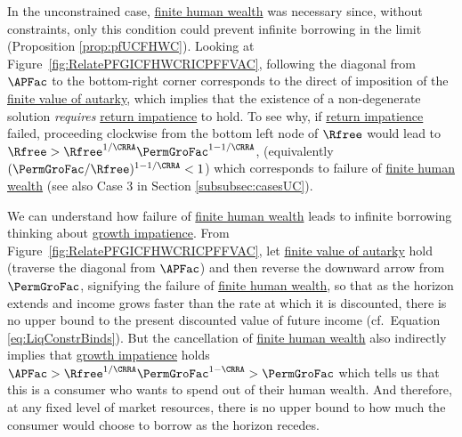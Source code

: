 \documentclass[\econtexRoot/BufferStockTheory]{subfiles}
\begin{document}
In the unconstrained case, \hyperlink{FHWC}{finite human wealth} was necessary since, without constraints, only  this condition could prevent infinite borrowing in the limit (Proposition \ref{prop:pfUCFHWC}).
Looking at Figure~\ref{fig:RelatePFGICFHWCRICPFFVAC}, following the diagonal from $\APFac$ to the bottom-right corner corresponds to the direct of imposition of the \hyperlink{PFFVAC}{finite value of autarky}, which implies that the existence of a non-degenerate solution \textit{requires} \hyperlink{RIC}{return impatience} to hold.
To see why, if \hyperlink{RIC}{return impatience} failed, proceeding clockwise from the bottom left node of $\Rfree$ would lead to $\Rfree> \Rfree^{1/\CRRA}\PermGroFac^{1-1/\CRRA}$, (equivalently $(\PermGroFac/\Rfree)^{1-{1/\CRRA}}<1$) which corresponds to failure of \hyperlink{FHWC}{finite human wealth} (see also Case 3 in Section \ref{subsubsec:casesUC}).


We can understand how failure of \hyperlink{FHWC}{finite human wealth} leads to infinite borrowing thinking about \hyperlink{GICRaw}{growth impatience}.
From Figure~\ref{fig:RelatePFGICFHWCRICPFFVAC}, let \hyperlink{PFFVAC}{finite value of autarky} hold (traverse the diagonal from $\APFac$)  and then reverse the downward arrow from $\PermGroFac$, signifying the failure of \hyperlink{FHWC}{finite human wealth}, so that as the horizon extends and income grows faster than the rate at which it is discounted, there is no upper bound to the present discounted value of future income (cf.\ Equation \eqref{eq:LiqConstrBinds}).
But the cancellation of \hyperlink{FHWC}{finite human wealth} also indirectly implies that \hyperlink{GICRaw}{growth impatience} holds $\APFac > \Rfree^{1/\CRRA}\PermGroFac^{1-\CRRA} > \PermGroFac$ which tells us that this is a consumer who wants to spend out of their human wealth.
And therefore, at any fixed level of market resources, there is no upper bound to how much the consumer would choose to borrow as the horizon recedes.

\end{document}
